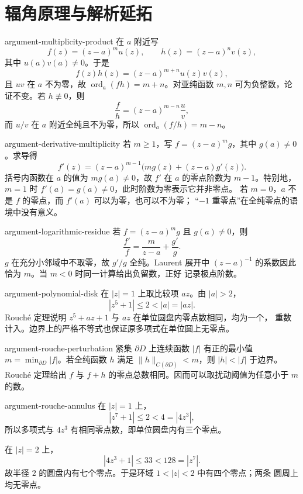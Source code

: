 \chapter{辐角原理与解析延拓}

\begin{solution}{argument-multiplicity-product}
在 $a$ 附近写
\[
 f(z)=(z-a)^m u(z),\qquad h(z)=(z-a)^n v(z),
\]
其中 $u(a)v(a)\ne0$。于是
\[
 f(z)h(z)=(z-a)^{m+n}u(z)v(z),
\]
且 $uv$ 在 $a$ 不为零，故 $\operatorname{ord}_a(fh)=m+n$。对亚纯函数
$m,n$ 可为负整数，论证不变。若 $h\not\equiv0$，则
\[
 \frac f h=(z-a)^{m-n}\frac uv,
\]
而 $u/v$ 在 $a$ 附近全纯且不为零，所以
$\operatorname{ord}_a(f/h)=m-n$。
\end{solution}

\begin{solution}{argument-derivative-multiplicity}
若 $m\ge1$，写 $f=(z-a)^m g$，其中 $g(a)\ne0$。求导得
\[
 f'(z)=(z-a)^{m-1}\bigl(mg(z)+(z-a)g'(z)\bigr).
\]
括号内函数在 $a$ 的值为 $mg(a)\ne0$，故 $f'$ 在 $a$ 的零点阶数为
$m-1$。特别地，$m=1$ 时 $f'(a)=g(a)\ne0$，此时阶数为零表示它并非零点。
若 $m=0$，$a$ 不是 $f$ 的零点，而 $f'(a)$ 可以为零，也可以不为零；
“$-1$ 重零点”在全纯零点的语境中没有意义。
\end{solution}

\begin{solution}{argument-logarithmic-residue}
若 $f=(z-a)^m g$ 且 $g(a)\ne0$，则
\[
 \frac{f'}f=\frac m{z-a}+\frac{g'}g.
\]
$g$ 在充分小邻域中不取零，故 $g'/g$ 全纯。Laurent 展开中
$(z-a)^{-1}$ 的系数因此恰为 $m$。当 $m<0$ 时同一计算给出负留数，正好
记录极点阶数。
\end{solution}

\begin{solution}{argument-polynomial-disk}
在 $|z|=1$ 上取比较项 $az$。由 $|a|>2$，
\[
 |z^5+1|\le2<|a|=|az|.
\]
Rouché 定理说明 $z^5+az+1$ 与 $az$ 在单位圆盘内零点数相同，均为一个，
重数计入。边界上的严格不等式也保证原多项式在单位圆上无零点。
\end{solution}

\begin{solution}{argument-rouche-perturbation}
紧集 $\partial D$ 上连续函数 $|f|$ 有正的最小值
$m=\min_{\partial D}|f|$。若全纯函数 $h$ 满足
$\|h\|_{C(\partial D)}<m$，则 $|h|<|f|$ 于边界。Rouché 定理给出
$f$ 与 $f+h$ 的零点总数相同。因而可以取扰动阈值为任意小于 $m$ 的数。
\end{solution}

\begin{solution}{argument-rouche-annulus}
在 $|z|=1$ 上，
\[
 |z^7+1|\le2<4=|4z^3|,
\]
所以多项式与 $4z^3$ 有相同零点数，即单位圆盘内有三个零点。

在 $|z|=2$ 上，
\[
 |4z^3+1|\le 33<128=|z^7|.
\]
故半径 $2$ 的圆盘内有七个零点。于是环域 $1<|z|<2$ 中有四个零点；两条
圆周上均无零点。
\end{solution}

